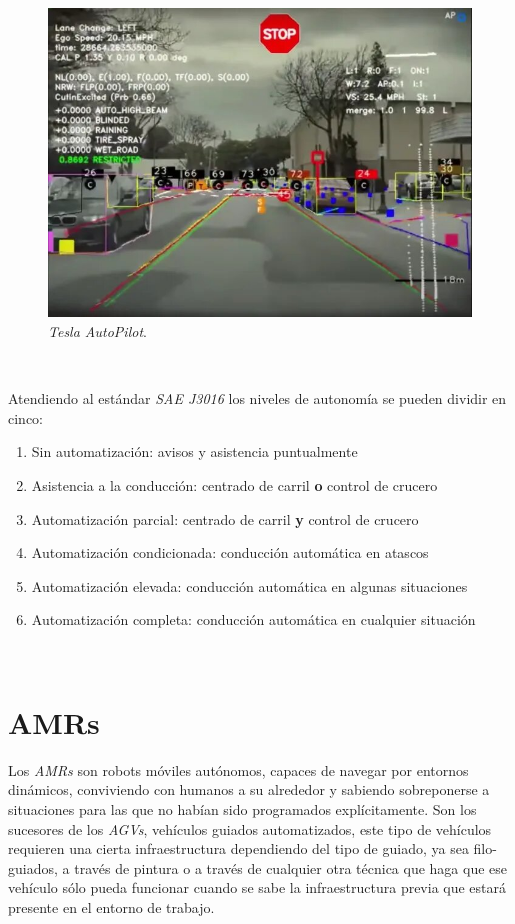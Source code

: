 \begin{figure} [h!]
	\begin{center}
		\includegraphics[width=12cm]{figs/teslaobjectdetection}
	\end{center}
	\caption{\textit{Tesla AutoPilot}.}
	\label{fig:teslaobjectdetection}
\end{figure}\

Atendiendo al estándar \textit{SAE J3016} los niveles de autonomía se pueden dividir en cinco:

\begin{enumerate}
	\item Sin automatización: avisos y asistencia puntualmente
	\item Asistencia a la conducción: centrado de carril \textbf{o} control de crucero
	\item Automatización parcial: centrado de carril \textbf{y} control de crucero
	\item Automatización condicionada: conducción automática en atascos
	\item Automatización elevada: conducción automática en algunas situaciones
	\item Automatización completa: conducción automática en cualquier situación
\end{enumerate}\
\cite{saej3016}

\section{AMRs}
\label{sec:amr}
Los  \textit{AMRs} son robots móviles autónomos, capaces de navegar por entornos dinámicos, conviviendo con humanos a su alrededor y sabiendo sobreponerse a situaciones para las que no habían sido programados explícitamente. Son los sucesores de los  \textit{AGVs}, vehículos guiados automatizados, este tipo de vehículos requieren una cierta infraestructura dependiendo del tipo de guiado, ya sea filo-guiados, a través de pintura o a través de cualquier otra técnica que haga que ese vehículo sólo pueda funcionar cuando se sabe la infraestructura previa que estará presente en el entorno de trabajo.\\

